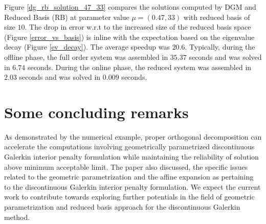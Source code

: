 \documentclass[graybox]{svmult}
\begin{document}
Figure \ref{dg_rb_solution_47_33} compares the solutions computed by DGM and Reduced Basis (RB) at parameter value $\mu = (0.47,33)$ with reduced basis of size $10$. The drop in error w.r.t to the increased size of the reduced basis space (Figure \ref{error_vs_basis}) is inline with the expectation based on the eigenvalue decay (Figure \ref{ev_decay}). The average speedup was $20.6$. Typically, during the offline phase, the full order system was assembled in $35.37$ seconds and was solved in $6.74$ seconds. During the online phase, the reduced system was assembled in $2.03$ seconds and was solved in $0.009$ seconds.

\section{Some concluding remarks}

As demonstrated by the numerical example, proper orthogonal decomposition can accelerate the computations involving geometrically parametrized discontinuous Galerkin interior penalty formulation while maintaining the reliability of solution above minimum acceptable limit. The paper also discussed, the specific issues related to the geometric parametrization and the affine expansion as pertaining to the discontinuous Galerkin interior penalty formulation. We expect the current work to contribute towards exploring further potentials in the field of geometric parametrization and reduced basis approach for the discontinuous Galerkin method.
\end{document}
